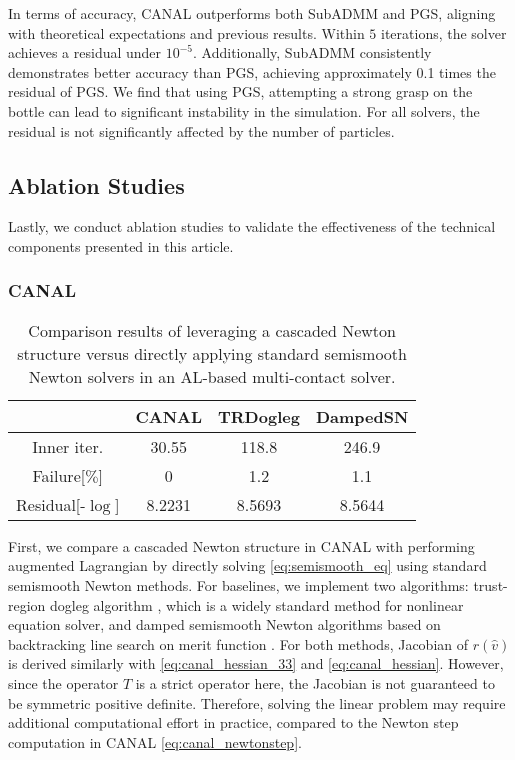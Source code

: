 \documentclass[lettersize,journal]{IEEEtran}
\begin{document}
In terms of accuracy, CANAL outperforms both SubADMM and PGS, aligning with theoretical expectations and previous results. 
Within $5$ iterations, the solver achieves a residual under $10^{-5}$. Additionally, SubADMM consistently demonstrates better accuracy than PGS, achieving approximately 0.1 times the residual of PGS.
We find that using PGS, attempting a strong grasp on the bottle can lead to significant instability in the simulation. For all solvers, the residual is not significantly affected by the number of particles.


\subsection{Ablation Studies}

Lastly, we conduct ablation studies to validate the effectiveness of the technical components presented in this article.

\subsubsection{CANAL}

\begin{table}[t]
\centering
\caption{Comparison results of leveraging a cascaded Newton structure versus directly applying standard semismooth Newton solvers in an AL-based multi-contact solver.}
\renewcommand{\arraystretch}{1.5}{
\begin{tabular}{|c|c|c|c|}
\hline
& CANAL & TRDogleg & DampedSN  \\
\hline
Inner iter. & 30.55 & 118.8 & 246.9  \\
\hline 
Failure[$\%$] &  0  & 1.2 & 1.1  \\
\hline 
Residual[-$\log$] & 8.2231 & 8.5693 & 8.5644 \\
\hline
\end{tabular}
}
\label{table:ablation_canal}
\end{table}

First, we compare a cascaded Newton structure in CANAL with performing augmented Lagrangian by directly solving \eqref{eq:semismooth_eq} using standard semismooth Newton methods.
For baselines, we implement two algorithms: trust-region dogleg algorithm \cite{nocedal1999numerical}, which is a widely standard method for nonlinear equation solver, and damped semismooth Newton algorithms based on backtracking line search on merit function \cite{de1996semismooth}.
For both methods, Jacobian of $r(\hat{v})$ is derived similarly with \eqref{eq:canal_hessian_33} and \eqref{eq:canal_hessian}. 
However, since the operator $T$ is a strict operator here, the Jacobian is not guaranteed to be symmetric positive definite. Therefore, solving the linear problem may require additional computational effort in practice, compared to the Newton step computation in CANAL \eqref{eq:canal_newtonstep}.
\end{document}
